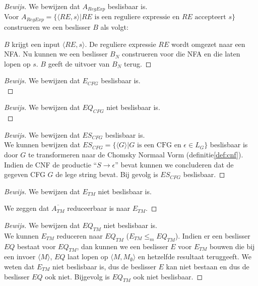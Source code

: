\documentclass[a4paper]{article}
\newenvironment{bewijs}[1]%
  {\begin{mdframed}[topline=true,
    rightline=true,
    leftline=true,
    bottomline=true]\begin{proof}[Bewijs]#1\\[.2cm]\normalfont}%
  {\end{proof}\end{mdframed}}
\newcommand{\atm}{\ensuremath{{A_{TM}}}}
\newcommand{\etm}{\ensuremath{{E_{TM}}}}
\newcommand{\eqtm}{\ensuremath{{EQ_{TM}}}}
\begin{document}
\begin{bewijs}{We bewijzen dat $A_{RegExp}$ beslisbaar is.}
  Voor $A_{RegExp} = \{\langle RE,s \rangle | RE \text{ is een reguliere expressie en } RE \text{ accepteert } s\}$ construeren we een beslisser $B$ als volgt:
 
 $B$ krijgt een input $\langle RE,s \rangle$. De reguliere expressie $RE$ wordt omgezet naar een NFA. Nu kunnen we een beslisser $B_N$ construeren voor die NFA en die laten lopen op $s$. $B$ geeft de uitvoer van $B_N$ terug.
\end{bewijs}


\begin{bewijs}{We bewijzen dat $E_{CFG}$ beslisbaar is.}
  
\end{bewijs}

\begin{bewijs}{We bewijzen dat $EQ_{CFG}$ niet beslisbaar is.}
  
\end{bewijs}

\begin{bewijs}{We bewijzen dat $ES_{CFG}$ beslisbaar is.}
  We kunnen bewijzen dat $ES_{CFG} = \{\langle G \rangle | G \text{ is een CFG en } \epsilon \in L_G\}$ beslisbaar is door $G$ te transformeren naar de Chomsky Normaal Vorm (definitie\ref{def:cnf}). Indien de CNF de productie ``$S \rightarrow \epsilon$'' bevat kunnen we concluderen dat de gegeven CFG $G$ de lege string bevat. Bij gevolg is $ES_{CFG}$ beslisbaar.
\end{bewijs}


\begin{bewijs}{We bewijzen dat $\etm$ niet beslisbaar is.}
  
  
  We zeggen dat $\overline{\atm}$ reduceerbaar is naar $\etm$.
\end{bewijs}

\begin{bewijs}{We bewijzen dat $\eqtm$ niet beslisbaar is.}
  We kunnen $\etm$ reduceren naar $\eqtm$ ($\etm \leq_m \eqtm$). Indien er een beslisser $EQ$ bestaat voor $\eqtm$, dan kunnen we een beslisser $E$ voor $\etm$ bouwen die bij een invoer $\langle M \rangle$, $EQ$ laat lopen op $\langle M,M_\emptyset \rangle$ en hetzelfde resultaat teruggeeft. We weten dat $\etm$ niet beslisbaar is, dus de beslisser $E$ kan niet bestaan en dus de beslisser $EQ$ ook niet. Bijgevolg is $\eqtm$ ook niet beslisbaar.
\end{bewijs}
\end{document}
